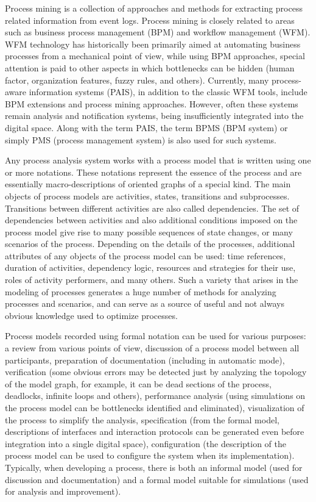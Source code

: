 \documentclass[
11pt,%
tightenlines,%
twoside,%
onecolumn,%
nofloats,%
nobibnotes,%
nofootinbib,%
superscriptaddress,%
noshowpacs,%
centertags]%
{revtex4}
\begin{document}
Process mining is a collection of approaches and methods for extracting process related information from event logs.
Process mining is closely related to areas such as business process management (BPM) and workflow management (WFM).
WFM technology has historically been primarily aimed at automating business processes from a mechanical point of view, while using BPM approaches, special attention is paid to other aspects in which bottlenecks can be hidden (human factor, organization features, fuzzy rules, and others).
Currently, many process-aware information systems (PAIS), in addition to the classic WFM tools, include BPM extensions and process mining approaches.
However, often these systems remain analysis and notification systems, being insufficiently integrated into the digital space.
Along with the term PAIS, the term BPMS (BPM system) or simply PMS (process management system) is also used for such systems.

Any process analysis system works with a process model that is written using one or more notations.
These notations represent the essence of the process and are essentially macro-descriptions of oriented graphs of a special kind.
The main objects of process models are activities, states, transitions and subprocesses.
Transitions between different activities are also called dependencies.
The set of dependencies between activities and also additional conditions imposed on the process model give rise to many possible sequences of state changes, or many scenarios of the process.
Depending on the details of the processes, additional attributes of any objects of the process model can be used: time references, duration of activities, dependency logic, resources and strategies for their use, roles of activity performers, and many others.
Such a variety that arises in the modeling of processes generates a huge number of methods for analyzing processes and scenarios, and can serve as a source of useful and not always obvious knowledge used to optimize processes.

Process models recorded using formal notation can be used for various purposes: a review from various points of view, discussion of a process model between all participants, preparation of documentation (including in automatic mode), verification (some obvious errors may be detected just by analyzing the topology of the model graph, for example, it can be dead sections of the process, deadlocks, infinite loops and others), performance analysis (using simulations on the process model can be bottlenecks identified and eliminated), visualization of the process to simplify the analysis, specification (from the formal model, descriptions of interfaces and interaction protocols can be generated even before integration into a single digital space), configuration (the description of the process model can be used to configure the system when its implementation).
Typically, when developing a process, there is both an informal model (used for discussion and documentation) and a formal model suitable for simulations (used for analysis and improvement). 
\end{document}

